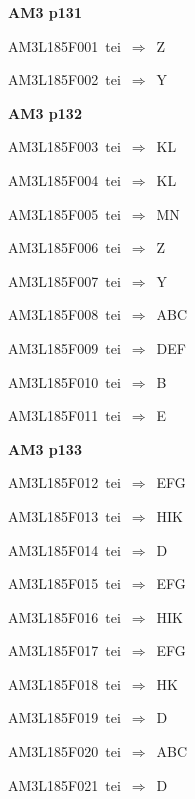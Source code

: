 \par\vfill\eject
{\bf\hfill AM3 p131\hfill\hbox{}}\par\bigskip
{\sixrm AM3L185F001\ {\sixit tei}\ }$\Rightarrow$\ Z\par\smallskip
{\sixrm AM3L185F002\ {\sixit tei}\ }$\Rightarrow$\ Y\par\smallskip

\par\vfill\eject
{\bf\hfill AM3 p132\hfill\hbox{}}\par\bigskip
{\sixrm AM3L185F003\ {\sixit tei}\ }$\Rightarrow$\ KL\par\smallskip
{\sixrm AM3L185F004\ {\sixit tei}\ }$\Rightarrow$\ KL\par\smallskip
{\sixrm AM3L185F005\ {\sixit tei}\ }$\Rightarrow$\ MN\par\smallskip
{\sixrm AM3L185F006\ {\sixit tei}\ }$\Rightarrow$\ Z\par\smallskip
{\sixrm AM3L185F007\ {\sixit tei}\ }$\Rightarrow$\ Y\par\smallskip
{\sixrm AM3L185F008\ {\sixit tei}\ }$\Rightarrow$\ ABC\par\smallskip
{\sixrm AM3L185F009\ {\sixit tei}\ }$\Rightarrow$\ DEF\par\smallskip
{\sixrm AM3L185F010\ {\sixit tei}\ }$\Rightarrow$\ B\par\smallskip
{\sixrm AM3L185F011\ {\sixit tei}\ }$\Rightarrow$\ E\par\smallskip

\par\vfill\eject
{\bf\hfill AM3 p133\hfill\hbox{}}\par\bigskip
{\sixrm AM3L185F012\ {\sixit tei}\ }$\Rightarrow$\ EFG\par\smallskip
{\sixrm AM3L185F013\ {\sixit tei}\ }$\Rightarrow$\ HIK\par\smallskip
{\sixrm AM3L185F014\ {\sixit tei}\ }$\Rightarrow$\ D\par\smallskip
{\sixrm AM3L185F015\ {\sixit tei}\ }$\Rightarrow$\ EFG\par\smallskip
{\sixrm AM3L185F016\ {\sixit tei}\ }$\Rightarrow$\ HIK\par\smallskip
{\sixrm AM3L185F017\ {\sixit tei}\ }$\Rightarrow$\ EFG\par\smallskip
{\sixrm AM3L185F018\ {\sixit tei}\ }$\Rightarrow$\ HK\par\smallskip
{\sixrm AM3L185F019\ {\sixit tei}\ }$\Rightarrow$\ D\par\smallskip
{\sixrm AM3L185F020\ {\sixit tei}\ }$\Rightarrow$\ ABC\par\smallskip
{\sixrm AM3L185F021\ {\sixit tei}\ }$\Rightarrow$\ D\par\smallskip

